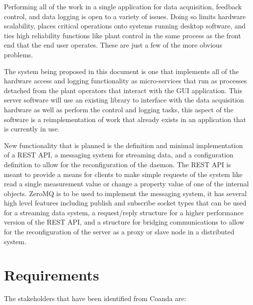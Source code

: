 \documentclass[11pt]{article}
\begin{document}
      Performing all of the work in a single application for data acquisition,
      feedback control, and data logging is open to a variety of issues. Doing so
      limits hardware scalability, places critical operations onto systems running
      desktop software, and ties high reliability functions like plant control in
      the same process as the front end that the end user operates. These are just
      a few of the more obvious problems.

      The system being proposed in this document is one that implements all of
      the hardware access and logging functionality as micro-services that run as
      processes detached from the plant operators that interact with the GUI
      application. This server software will use an existing library to interface
      with the data acquisition hardware as well as perform the control and
      logging tasks, this aspect of the software is a reimplementation of work
      that already exists in an application that is currently in use.

      New functionality that is planned is the definition and minimal
      implementation of a REST API, a messaging system for streaming data, and a
      configuration definition to allow for the reconfiguration of the daemon. The
      REST API is meant to provide a means for clients to make simple requests of
      the system like read a single measurement value or change a property value
      of one of the internal objects. ZeroMQ is to be used to implement the
      messaging system, it has several high level features including publish and
      subscribe socket types that can be used for a streaming data system, a
      request/reply structure for a higher performance version of the REST API,
      and a structure for bridging communications to allow for the reconfiguration
      of the server as a proxy or slave node in a distributed system.

  \section{Requirements}\label{sec:req}

    The stakeholders that have been identified from Coanda are:
\end{document}
